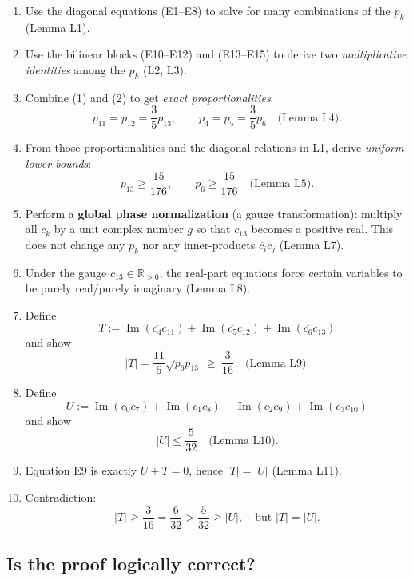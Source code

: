 \documentclass[11pt]{article}
\begin{document}
\begin{enumerate}
\item Use the diagonal equations (E1--E8) to solve for many combinations of the $p_k$ (Lemma L1).
\item Use the bilinear blocks (E10--E12) and (E13--E15) to derive two \emph{multiplicative identities} among the $p_k$ (L2, L3).
\item Combine (1) and (2) to get \emph{exact proportionalities}:
  \[
  p_{11}=p_{12}=\frac35 p_{13},\qquad p_4=p_5=\frac35 p_6 \quad \text{(Lemma L4)}.
  \]
\item From those proportionalities and the diagonal relations in L1, derive \emph{uniform lower bounds}:
  \[
  p_{13}\ge \frac{15}{176},\qquad p_6\ge \frac{15}{176} \quad \text{(Lemma L5)}.
  \]
\item Perform a \textbf{global phase normalization} (a gauge transformation): multiply all $c_k$ by a unit complex number $g$ so that $c_{13}$ becomes a positive real. This does not change any $p_k$ nor any inner-products $\overline{c_i}c_j$ (Lemma L7).
\item Under the gauge $c_{13}\in\mathbb{R}_{>0}$, the real-part equations force certain variables to be purely real/purely imaginary (Lemma L8).
\item Define
  \[
  T := \operatorname{Im}(\overline{c_4}c_{11})+\operatorname{Im}(\overline{c_5}c_{12})+\operatorname{Im}(\overline{c_6}c_{13})
  \]
  and show
  \[
  |T| = \frac{11}{5}\sqrt{p_6p_{13}} \ \ge\ \frac{3}{16} \quad \text{(Lemma L9)}.
  \]
\item Define
  \[
  U := \operatorname{Im}(\overline{c_0}c_{7})+\operatorname{Im}(\overline{c_1}c_{8})+\operatorname{Im}(\overline{c_2}c_{9})+\operatorname{Im}(\overline{c_3}c_{10})
  \]
  and show
  \[
  |U|\le \frac{5}{32} \quad \text{(Lemma L10)}.
  \]
\item Equation E9 is exactly $U+T=0$, hence $|T|=|U|$ (Lemma L11).
\item Contradiction:
  \[
  |T|\ge \frac{3}{16}=\frac{6}{32} > \frac{5}{32}\ge |U|,\quad \text{but } |T|=|U|.
  \]
\end{enumerate}

\subsection*{Is the proof logically correct?}
\end{document}

